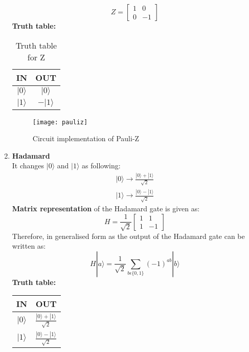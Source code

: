 \documentclass[12pt]{report}
\begin{document}
\begin{enumerate}
\begin{equation*}
Z = 
\begin{bmatrix} 
1& 0\\ 
0&-1 
\end{bmatrix}
\end{equation*}
\textbf{Truth table:}\\
\begin{table}[h!]
\centering
\begin{tabular}{|c|c|}
\hline
IN & OUT\\
\hline
$|0\rangle$ & $|0\rangle$\\
\hline
$|1\rangle$ & $-|1\rangle$\\
\hline
\end{tabular}
\caption{Truth table for Z} 
\end{table}
\begin{figure}[h]
\centering
\texttt{[image: pauliz]}
\caption{Circuit implementation of Pauli-Z}
\label{fig:pauliz}
\end{figure}
\item \textbf{Hadamard}\\
It changes $|0\rangle$ and  $|1\rangle$ as following: \\
\begin{equation*}
\begin{split}
|0\rangle  \to \frac{|0\rangle + |1\rangle}{\sqrt{2}}\\
|1\rangle  \to \frac{|0\rangle - |1\rangle}{\sqrt{2}}
\end{split}
\end{equation*}
\textbf{Matrix representation} of the Hadamard gate is given as: 
\begin{equation*}
H = \frac{1}{\sqrt{2}}
\begin{bmatrix} 
1& 1\\ 
1&-1 
\end{bmatrix}
\end{equation*}
Therefore, in generalised form as the output of the Hadamard gate can be written as:
\begin{equation}
H|a\rangle = \frac{1}{\sqrt{2}} \sum_{b\epsilon\{0,1\}} (-1)^{ab} |b\rangle
\end{equation}
\textbf{Truth table:}\\
\begin{table}[h!]
\centering
\begin{tabular}{|c|c|}
\hline
IN & OUT\\
\hline
$|0\rangle$ & $\frac{|0\rangle + |1\rangle}{\sqrt{2}}$\\
\hline
$|1\rangle$ & $\frac{|0\rangle - |1\rangle}{\sqrt{2}}$\\

\end{tabular}
\end{table}
\end{enumerate}
\end{document}
